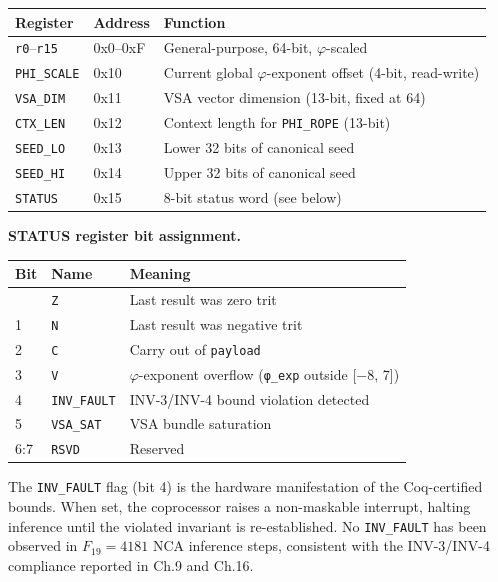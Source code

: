 \begin{longtable}[]{@{}llp{6cm}@{}}
\toprule\noalign{}
Register & Address & Function \\
\midrule\noalign{}
\endhead
\bottomrule\noalign{}
\endlastfoot
\texttt{r0}--\texttt{r15} & 0x0--0xF &
General-purpose, 64-bit, \(\varphi\)-scaled \\
\texttt{PHI\_SCALE} & 0x10 & Current global
\(\varphi\)-exponent offset (4-bit, read-write) \\
\texttt{VSA\_DIM} & 0x11 & VSA vector dimension
(13-bit, fixed at 64) \\
\texttt{CTX\_LEN} & 0x12 & Context length for
\texttt{PHI\_ROPE} (13-bit) \\
\texttt{SEED\_LO} & 0x13 & Lower 32 bits of
canonical seed \\
\texttt{SEED\_HI} & 0x14 & Upper 32 bits of
canonical seed \\
\texttt{STATUS} & 0x15 & 8-bit status word (see
below) \\
\end{longtable}

\textbf{STATUS register bit assignment.}

\begin{longtable}[]{@{}llp{7cm}@{}}
\toprule\noalign{}
Bit & Name & Meaning \\
\midrule\noalign{}
\endhead
\bottomrule\noalign{}
\endlastfoot
0 & \texttt{Z} & Last result was zero trit \\
1 & \texttt{N} & Last result was negative trit \\
2 & \texttt{C} & Carry out of \texttt{payload} \\
3 & \texttt{V} & \(\varphi\)-exponent overflow
(\texttt{φ\_exp} outside {[}−8, 7{]}) \\
4 & \texttt{INV\_FAULT} & INV-3/INV-4 bound
violation detected \\
5 & \texttt{VSA\_SAT} & VSA bundle saturation \\
6:7 & \texttt{RSVD} & Reserved \\
\end{longtable}

The \texttt{INV\_FAULT} flag (bit 4) is the
hardware manifestation of the Coq-certified bounds.
When set, the coprocessor raises a non-maskable
interrupt, halting inference until the violated
invariant is re-established. No \texttt{INV\_FAULT}
has been observed in \(F_{19} = 4181\) NCA
inference steps, consistent with the INV-3/INV-4
compliance reported in Ch.9 and Ch.16.

